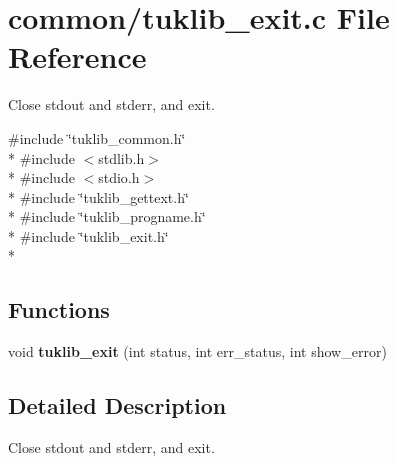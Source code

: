 \section{common/tuklib\-\_\-exit.c File Reference}
\label{tuklib__exit_8c}


Close stdout and stderr, and exit.  


{\ttfamily \#include \char`\"{}tuklib\-\_\-common.\-h\char`\"{}}\\*
{\ttfamily \#include $<$stdlib.\-h$>$}\\*
{\ttfamily \#include $<$stdio.\-h$>$}\\*
{\ttfamily \#include \char`\"{}tuklib\-\_\-gettext.\-h\char`\"{}}\\*
{\ttfamily \#include \char`\"{}tuklib\-\_\-progname.\-h\char`\"{}}\\*
{\ttfamily \#include \char`\"{}tuklib\-\_\-exit.\-h\char`\"{}}\\*
\subsection*{Functions}
\begin{DoxyCompactItemize}
\item 
void {\bfseries tuklib\-\_\-exit} (int status, int err\-\_\-status, int show\-\_\-error)\label{tuklib__exit_8c_acd91d79afa1202dbaa59ede3d0892031}

\end{DoxyCompactItemize}


\subsection{Detailed Description}
Close stdout and stderr, and exit. 